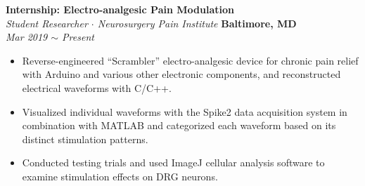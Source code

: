 \documentclass[10pt, letterpaper]{article}
\begin{document}
\iffalse
\begin{paracol}{2}
	\textbf{Internship: Medical Image Segmentation}\\
	\textit{Delineator $\cdot$ Image Analysis \& Communications Lab (\textbf{IACL})}
	\switchcolumn
	\raggedleft\textbf{Baltimore, MD}\\
	\raggedleft\textit{Aug 2020 $\sim$ Present}
\end{paracol}
\vspace{-2mm}
\begin{itemize}
	\item Traced thalamus segmentation based on MRI scans and created training data for image segmentation algorithm.
\end{itemize}
\vspace{-2mm} 
\fi
{}

\iffalse
\begin{paracol}{2}
	\textbf{Internship: Electro-analgesic Pain Modulation}\\
	\textit{Student Researcher $\cdot$ Neurosurgery Pain Institute}
	\switchcolumn \hfill
	\raggedleft\textbf{Baltimore, MD}\\
	\raggedleft\textit{Mar 2019 $\sim$ Present}
\end{paracol}\vspace{-1mm}
\vspace{-3mm}
\begin{itemize}
	\item Reverse-engineered ``Scrambler'' electro-analgesic device for chronic pain relief with 
	Arduino and various other electronic components, and reconstructed electrical waveforms 
	with C/C++.
	\vspace{-3mm}
	\item Visualized individual waveforms with the Spike2 data acquisition system in combination 
	with MATLAB and categorized each waveform based on its distinct stimulation patterns.
	\vspace{-3mm}
	\item Conducted testing trials and used ImageJ cellular analysis software to examine stimulation effects on DRG neurons.
\end{itemize}
\vspace{-3mm} 
\end{document}
